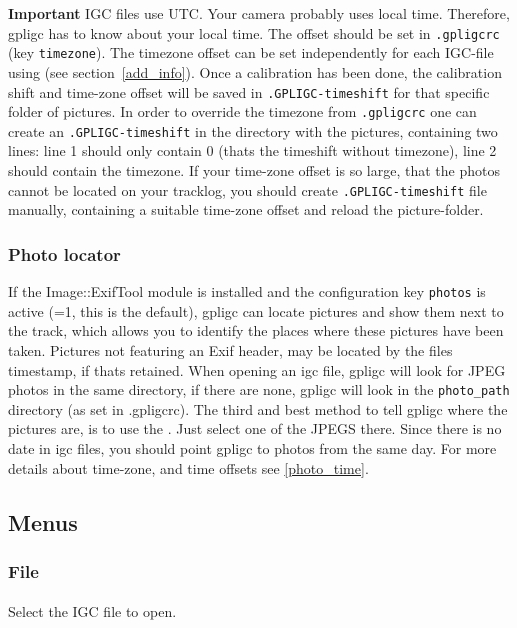\textbf{Important}  IGC files use UTC. Your camera probably uses local time. Therefore, gpligc has to know about your local time. The offset should be set in \texttt{.gpligcrc} (key \texttt{timezone}). The timezone offset can be set independently for each IGC-file using  (see section~\ref{add_info}).
Once a calibration has been done, the calibration shift and time-zone offset will be saved in \texttt{.GPLIGC-timeshift} for that specific folder of pictures. In order to override the timezone from \texttt{.gpligcrc} one can create an \texttt{.GPLIGC-timeshift} in the directory with the pictures, containing two lines: line 1 should only contain 0 (thats the timeshift without timezone), line 2 should contain the timezone.
If your time-zone offset is so large, that the photos cannot be located on your tracklog, you should create \texttt{.GPLIGC-timeshift} file manually, containing a suitable time-zone offset and reload the picture-folder.


\subsubsection{Photo locator}
If the Image::ExifTool module is installed and the configuration key \texttt{photos} is active (=1, this is the default),
gpligc can locate pictures and show them next to the track, which allows you to identify the places where these pictures have been taken. Pictures not featuring an Exif header, may be located by the files timestamp, if thats retained.
When opening an igc file, gpligc will look for JPEG photos in the same directory, if there are none, gpligc will look in the
\texttt{photo\_path} directory (as set in .gpligcrc). The third and best method to tell gpligc where the pictures are, is to use the
. Just select one of the JPEGS there.
Since there is no date in igc files, you should point gpligc to photos from the same day. For more details about time-zone, and time offsets see \ref{photo_time}.


\subsection{Menus}

\subsubsection{File}

\paragraph{%
}
Select the IGC file to open.

